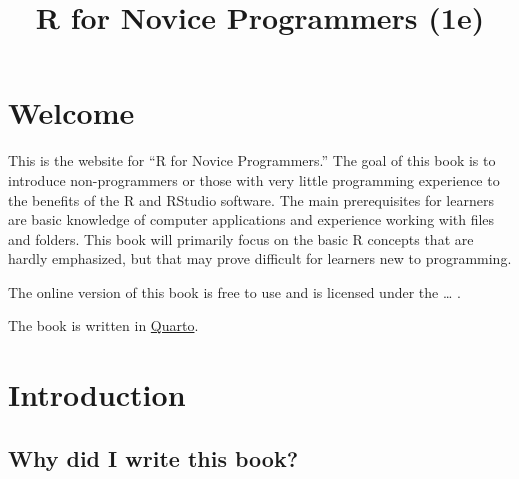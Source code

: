 \documentclass[
  letterpaper,
  DIV=11,
  numbers=noendperiod]{scrreprt}
\title{R for Novice Programmers (1e)}
\author{}
\date{}
\renewcommand*\contentsname{Table of contents}
\newcommand\contentsname{Table of contents}
\begin{document}
\maketitle
\ifdefined\Shaded\renewenvironment{Shaded}{\begin{tcolorbox}[interior hidden, sharp corners, frame hidden, breakable, borderline west={3pt}{0pt}{shadecolor}, enhanced, boxrule=0pt]}{\end{tcolorbox}}\fi

\renewcommand*\contentsname{Table of contents}
{
\hypersetup{linkcolor=}
\setcounter{tocdepth}{2}
\tableofcontents
}

\hypertarget{welcome}{%
\chapter*{Welcome}\label{welcome}}


This is the website for ``R for Novice Programmers.'' The goal of this
book is to introduce non-programmers or those with very little
programming experience to the benefits of the R and RStudio software.
The main prerequisites for learners are basic knowledge of computer
applications and experience working with files and folders. This book
will primarily focus on the basic R concepts that are hardly emphasized,
but that may prove difficult for learners new to programming.

The online version of this book is free to use and is licensed under the
\ldots{} .

The book is written in \href{https://quarto.org/}{Quarto}.


\hypertarget{introduction}{%
\chapter*{Introduction}\label{introduction}}


\hypertarget{why-did-i-write-this-book}{%
\section*{Why did I write this book?}\label{why-did-i-write-this-book}}
\end{document}
